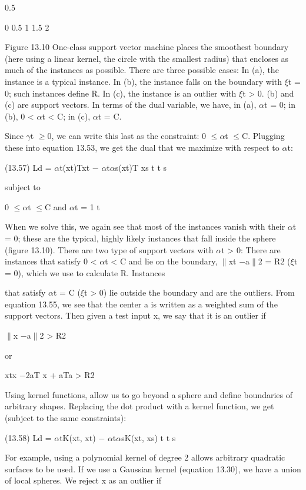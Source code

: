 0.5

0 0.5 1 1.5 2

Figure 13.10 One-class support vector machine places the smoothest boundary (here using a linear kernel, the circle with the smallest radius) that encloses as much of the instances as possible. There are three possible cases: In (a), the instance is a typical instance. In (b), the instance falls on the boundary with $\xi$t = 0; such instances define R. In (c), the instance is an outlier with $\xi$t > 0. (b) and (c) are support vectors. In terms of the dual variable, we have, in (a), $\alpha$t = 0; in (b), 0 < $\alpha$t < C; in (c), $\alpha$t = C.

Since $\gamma$t $\geq$0, we can write this last as the constraint: 0 $\leq$$\alpha$t $\leq$C. Plugging these into equation 13.53, we get the dual that we maximize with respect to $\alpha$t:

(13.57) Ld = $\alpha$t(xt)Txt $-$ $\alpha$t$\alpha$s(xt)T xs t t s

subject to

0 $\leq$$\alpha$t $\leq$C and $\alpha$t = 1 t

When we solve this, we again see that most of the instances vanish with their $\alpha$t = 0; these are the typical, highly likely instances that fall inside the sphere (figure 13.10). There are two type of support vectors with $\alpha$t > 0: There are instances that satisfy 0 < $\alpha$t < C and lie on the boundary, $\parallel$xt $-$a$\parallel$2 = R2 ($\xi$t = 0), which we use to calculate R. Instances

that satisfy $\alpha$t = C ($\xi$t > 0) lie outside the boundary and are the outliers. From equation 13.55, we see that the center a is written as a weighted sum of the support vectors. Then given a test input x, we say that it is an outlier if

$\parallel$x $-$a$\parallel$2 > R2

or

xtx $-$2aT x + aTa > R2

Using kernel functions, allow us to go beyond a sphere and define boundaries of arbitrary shapes. Replacing the dot product with a kernel function, we get (subject to the same constraints):

(13.58) Ld = $\alpha$tK(xt, xt) $-$ $\alpha$t$\alpha$sK(xt, xs) t t s

For example, using a polynomial kernel of degree 2 allows arbitrary quadratic surfaces to be used. If we use a Gaussian kernel (equation 13.30), we have a union of local spheres. We reject x as an outlier if

